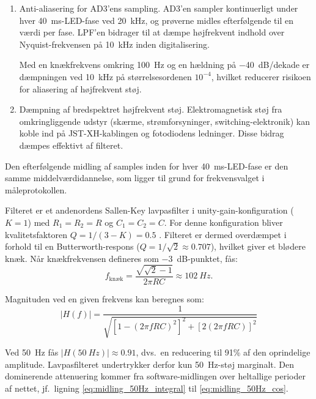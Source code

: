 \begin{enumerate}
    \item Anti-aliasering for AD3'ens sampling. AD3'en sampler kontinuerligt under hver \SI{40}{ms}-LED-fase ved \SI{20}{kHz}, og prøverne midles efterfølgende til en værdi per fase. LPF'en bidrager til at dæmpe højfrekvent indhold over Nyquist-frekvensen på \SI{10}{kHz} inden digitalisering.

Med en knækfrekvens omkring \SI{100}{Hz} og en hældning på \SI{-40}{dB/dekade} er dæmpningen ved \SI{10}{kHz} på størrelsesordenen $10^{-4}$, hvilket reducerer risikoen for aliasering af højfrekvent støj.

    \item Dæmpning af bredspektret højfrekvent støj. Elektromagnetisk støj fra omkringliggende udstyr (skærme, strømforsyninger, switching-elektronik) kan koble ind på JST-XH-kablingen og fotodiodens ledninger. Disse bidrag dæmpes effektivt af filteret.
\end{enumerate}

Den efterfølgende midling af samples inden for hver \SI{40}{ms}-LED-fase er den samme middelværdidannelse, som ligger til grund for frekvensvalget i måleprotokollen.

Filteret er et andenordens Sallen-Key lavpasfilter i unity-gain-konfiguration ($K=1$) med $R_1=R_2=R$ og $C_1=C_2=C$. For denne konfiguration bliver kvalitetsfaktoren $Q = 1/(3-K) = 0.5$ \parencite{Karki2002}. Filteret er dermed overdæmpet i forhold til en Butterworth-respons ($Q = 1/\sqrt{2} \approx 0.707$), hvilket giver et blødere knæk. Når knækfrekvensen defineres som \SI{-3}{dB}-punktet, fås:
\begin{equation}
    f_{\text{knæk}} =
    \frac{\sqrt{\sqrt{2}-1}}{2\pi R C}
    \approx \SI{102}{Hz}.
\end{equation}

Magnituden ved en given frekvens kan beregnes som:
\begin{equation}
    |H(f)| =
    \frac{1}{\sqrt{\left[1 - (2\pi f R C)^2\right]^2 + \left[2(2\pi f R C)\right]^2}}
\end{equation}

Ved \SI{50}{Hz} fås $|H(\SI{50}{Hz})| \approx 0.91$, dvs.\ en reducering til 91\% af den oprindelige amplitude. Lavpasfilteret undertrykker derfor kun \SI{50}{Hz}-støj marginalt. Den dominerende attenuering kommer fra software-midlingen over heltallige perioder af nettet, jf.\ ligning \ref{eq:midling_50Hz_integral} til \ref{eq:midling_50Hz_cos}.

